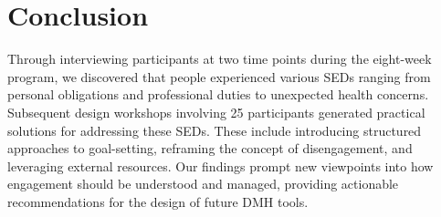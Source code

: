 \section{Conclusion}
 Through interviewing participants at two time points during the eight-week program, we discovered that people experienced various SEDs ranging from personal obligations and professional duties to unexpected health concerns. Subsequent design workshops involving 25 participants generated practical solutions for addressing these SEDs. These include introducing structured approaches to goal-setting, reframing the concept of disengagement, and leveraging external resources. Our findings prompt new viewpoints into how engagement should be understood and managed, providing actionable recommendations for the design of future DMH tools.





